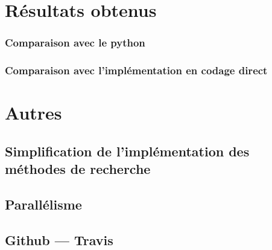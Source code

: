 \documentclass[hideweeklyreports]{polytech/polytech}
\begin{document}
	\chapter{Résultats obtenus}
		\subsection{Comparaison avec le python} %
		\subsection{Comparaison avec l'implémentation en codage direct}
	
	\chapter{Autres}
		\section{Simplification de l'implémentation des méthodes de recherche} %
		\section{Parallélisme} %
		\section{Github — Travis} %
\end{document}
